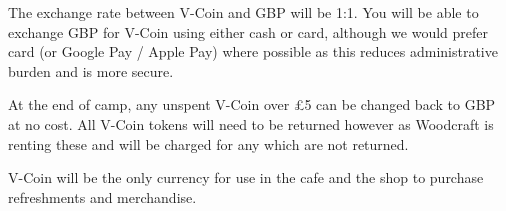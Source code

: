 \documentclass[a4paper, 11pt]{report}
\begin{document}
The exchange rate between V-Coin and GBP will be 1:1. You will be able to exchange GBP for V-Coin using either cash or card, although we would prefer card (or Google Pay / Apple Pay) where possible as this reduces administrative burden and is more secure.\nl

At the end of camp, any unspent V-Coin over £5 can be changed back to GBP at no cost. All V-Coin tokens will need to be returned however as Woodcraft is renting these and will be charged for any which are not returned.\nl

V-Coin will be the only currency for use in the cafe and the shop to purchase refreshments and merchandise.


\backPagebw
\end{document}
